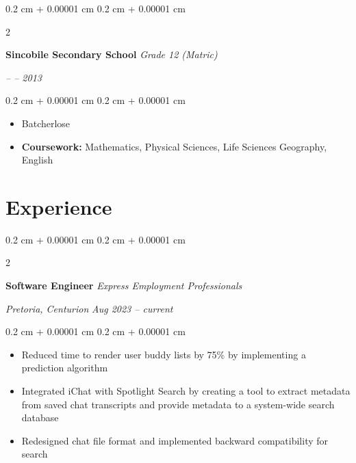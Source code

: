 \documentclass[10pt, letterpaper]{article}
\newenvironment{highlights}{
    \begin{itemize}[
        topsep=0.10 cm,
        parsep=0.10 cm,
        partopsep=0pt,
        itemsep=0pt,
        leftmargin=0.4 cm + 10pt
    ]
}{
    \end{itemize}
} %
\newenvironment{onecolentry}{
    \begin{adjustwidth}{
        0.2 cm + 0.00001 cm
    }{
        0.2 cm + 0.00001 cm
    }
}{
    \end{adjustwidth}
} %
\newenvironment{twocolentry}[2][]{
    \onecolentry
    \def\secondColumn{#2}
    \setcolumnwidth{\fill, 4.5 cm}
    \begin{paracol}{2}
}{
    \switchcolumn \raggedleft \secondColumn
    \end{paracol}
    \endonecolentry
} %
\let\hrefWithoutArrow\href
\renewcommand{\href}[2]{\hrefWithoutArrow{#1}{\ifthenelse{\equal{#2}{}}{ }{#2 }\raisebox{.15ex}{\footnotesize \faExternalLink*}}}
\begin{document}
        \vspace{0.2 cm}

        \begin{twocolentry}{

        \textit{– – 2013}}
            \textbf{Sincobile Secondary School}
            \newline
            \textit{Grade 12 (Matric)}
        \end{twocolentry}

        \vspace{0.10 cm}
        \begin{onecolentry}
            \begin{highlights}
                \item Batcherlose %
                \item \textbf{Coursework:} Mathematics, Physical Sciences, Life Sciences Geography, English
            \end{highlights}
        \end{onecolentry}

    \section{Experience}

        \begin{twocolentry}{
        \textit{Pretoria, Centurion}
        \newline
        \textit{Aug 2023 – current}}
            \textbf{Software Engineer}
            \newline
            \textit{Express Employment Professionals}
        \end{twocolentry}

        \vspace{0.20 cm}
        \begin{onecolentry}
            \begin{highlights}
                \item Reduced time to render user buddy lists by 75\% by implementing a prediction algorithm
                \item Integrated iChat with Spotlight Search by creating a tool to extract metadata from saved chat transcripts and provide metadata to a system-wide search database
                \item Redesigned chat file format and implemented backward compatibility for search
            \end{highlights}
        \end{onecolentry}
\end{document}
